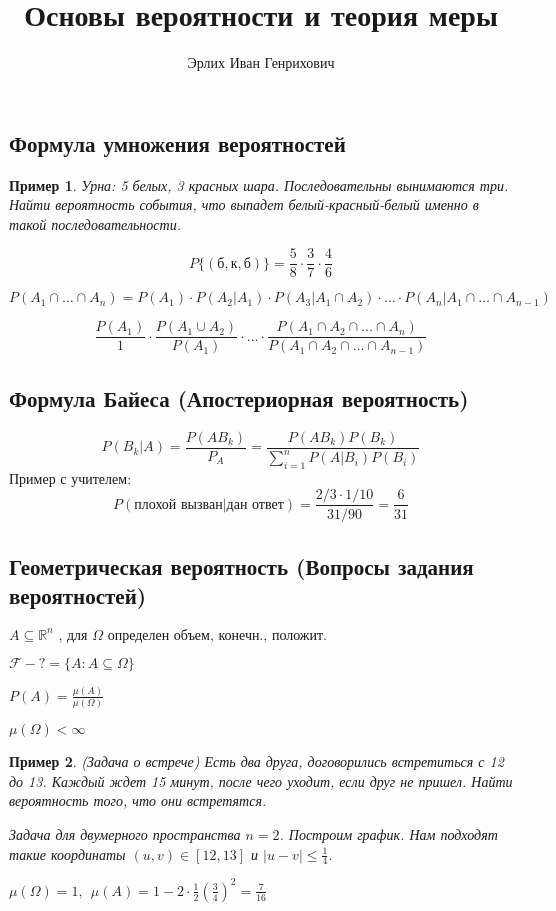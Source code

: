 \documentclass{article}
\author{Эрлих Иван Генрихович}
\title{Основы вероятности и теория меры}
\newtheorem*{xmp}{Пример}
\begin{document}
\maketitle

\subsection*{Формула умножения вероятностей}
\begin{xmp}
  Урна: 5 белых, 3 красных шара. Последовательны вынимаются три. Найти вероятность события, что выпадет белый-красный-белый именно в такой последовательности.
  
  $$ P\{(\text{б},\text{к},\text{б})\} = \frac{5}{8} \cdot \frac{3}{7} \cdot \frac{4}{6} $$
  
  $$ P(A_1 \cap \ldots \cap A_n) = P(A_1) \cdot P(A_2|A_1) \cdot P(A_3|A_1 \cap A_2) \cdot \ldots \cdot P(A_n | A_1 \cap \ldots \cap A_{n-1}) $$
  
  $$ \frac{P(A_1)}{1} \cdot \frac{P(A_1 \cup A_2)}{P(A_1)} \cdot \ldots \cdot \frac{P(A_1 \cap A_2 \cap \ldots \cap A_n)}{P(A_1 \cap A_2 \cap \ldots \cap A_{n - 1})} $$
\end{xmp}

\subsection*{Формула Байеса (Апостериорная вероятность)}
$$ P(B_k | A) = \frac{P(AB_k)}{P_A} = \frac{P(AB_k)P(B_k)}{\sum\limits_{i=1}^{n} P(A|B_i) P(B_i)} $$
Пример с учителем:
$$ P (\text{плохой вызван} | \text{дан ответ} ) = \frac{2/3 \cdot 1/10}{31/90} = \frac{6}{31} $$

\subsection*{Геометрическая вероятность (Вопросы задания вероятностей)}

  $ A \subseteq \mathbb{R}^n \text{ , для $\Omega$ определен объем, конечн., положит.}$
  
  \noindent $ \mathcal{F} - ? = \{ A : A \subseteq \Omega\}$
  
  \noindent $ P(A) = \frac{\mu(A)}{\mu(\Omega)} $
  
  \noindent $ \mu(\Omega) < \infty $

\begin{xmp}(Задача о встрече)
Есть два друга, договорились встретиться с 12 до 13. Каждый ждет 15 минут, после чего уходит, если друг не пришел. Найти вероятность того, что они встретятся.

Задача для двумерного пространства $n = 2$. Построим график. Нам подходят такие координаты $(u, v) \in [12, 13]$ и $ |u - v| \leqslant \frac{1}{4} $.

$ \mu(\Omega) = 1,~~ \mu(A) = 1 - 2 \cdot \frac{1}{2} \left(\frac{3}{4}\right)^2 = \frac{7}{16} $
\end{xmp}
\end{document}
